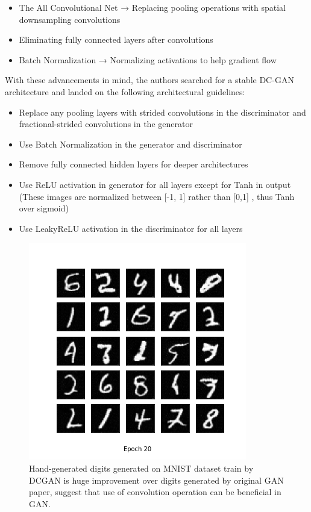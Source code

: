 \documentclass{article}
\begin{document}
\begin{itemize}

    \item The All Convolutional Net → Replacing pooling operations with spatial downsampling convolutions
    \item Eliminating fully connected layers after convolutions
    \item Batch Normalization → Normalizing activations to help gradient flow

\end{itemize}

With these advancements in mind, the authors searched for a stable DC-GAN architecture and landed on the following architectural guidelines:

\begin{itemize}

    \item Replace any pooling layers with strided convolutions in the discriminator and fractional-strided convolutions in the generator
    \item Use Batch Normalization in the generator and discriminator
    \item Remove fully connected hidden layers for deeper architectures
    \item Use ReLU activation in generator for all layers except for Tanh in output (These images are normalized between [-1, 1] rather than [0,1] , thus Tanh over sigmoid)
    \item Use LeakyReLU activation in the discriminator for all layers

\end{itemize}


\begin{figure}[h]
    \centering
    \includegraphics[width=.5\textwidth]{images/dcgan_result.png}
    \caption{Hand-generated digits generated on MNIST dataset train by DCGAN is huge improvement over digits generated by original GAN paper, suggest that use of convolution operation can be beneficial in GAN. }
    \label{fig:mesh1}
\end{figure}
\medskip
\end{document}
